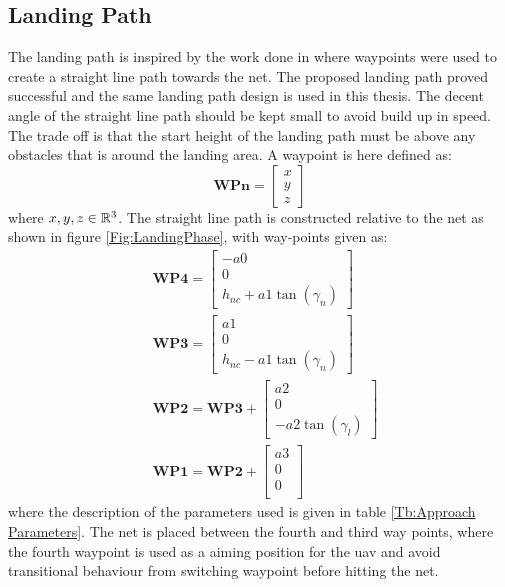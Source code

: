 \subsection{Landing Path}\label{SS:netApproach}
The landing path is inspired by the work done in \citep{Skulstad&Syversen} where waypoints were used to create a straight line path towards the net. The proposed landing path proved successful and the same landing path design is used in this thesis. The decent angle of the straight line path should be kept small to avoid build up in speed. The trade off is that the start height of the landing path must be above any obstacles that is around the landing area. A waypoint is here defined as:
\begin{equation}
\textbf{WPn} = \begin{bmatrix}
x \\
y \\
z
\end{bmatrix}
\end{equation}
where $x,y,z \in \Bbb R^3$. The straight line path is constructed relative to the net as shown in figure \ref{Fig:LandingPhase}, with way-points given as:
\begin{subequations}
\begin{align}
&\mathbf{WP4} = 
\begin{bmatrix}
-a0 \\
0 \\
h_{nc} + a1\tan(\gamma_n) 
\end{bmatrix}\\
&\mathbf{WP3} = 
\begin{bmatrix}
a1 \\
0 \\
h_{nc} - a1\tan(\gamma_n)
\end{bmatrix}\\
&\mathbf{WP2} = \mathbf{WP3} + 
\begin{bmatrix}
a2 \\
0 \\
-a2\tan(\gamma_l)
\end{bmatrix}\\
&\mathbf{WP1} = \mathbf{WP2} + 
\begin{bmatrix}
a3 \\
0 \\
0 \\
\end{bmatrix}
\end{align}
\end{subequations}
where the description of the parameters used is given in table \ref{Tb:Approach Parameters}. The net is placed between the fourth and third way points, where the fourth waypoint is used as a aiming position for the \gls{uav} and avoid transitional behaviour from switching waypoint before hitting the net.
